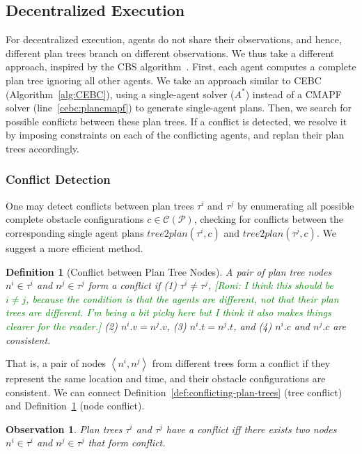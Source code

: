 \documentclass[letterpaper]{article} %
\newcommand{\toplan}{\textit{tree2plan}}
\newcommand{\tuple}[1]{\ensuremath{\left \langle #1 \right \rangle }}
\newcommand{\roni}[1]{{\textcolor{green}{[Roni: #1]}}}
\newtheorem{observation}{Observation}
\newtheorem{definition}{Definition}
\begin{document}
\subsection{Decentralized Execution}
\label{scn:decentralized}

For decentralized execution, agents do not share their observations, and hence, different plan trees branch on different observations. 
We thus take a different approach, inspired by the CBS algorithm~\cite{sharon2015conflict}. 
First, each agent computes a complete plan tree ignoring all other agents. We take an approach similar to CEBC (Algorithm~\ref{alg:CEBC}), using a single-agent solver ($A^*$) instead of a CMAPF solver (line~\ref{cebc:plancmapf}) to generate single-agent plans.
Then, we search for possible conflicts between these plan trees. 
If a conflict is detected, we resolve it by imposing 
constraints on each of the conflicting agents, and replan their plan trees accordingly. 


\subsubsection{Conflict Detection}
\label{scn:conflicts}
One may detect conflicts between plan trees $\tau^i$ and $\tau^j$ by enumerating all possible complete obstacle configurations $c\in\mathcal{C}(\mathcal{P})$, checking for conflicts between the corresponding single agent plans $\toplan(\tau^i,c)$ and $\toplan(\tau^j,c)$. 
We suggest a more efficient method. 
\begin{definition}[Conflict between Plan Tree Nodes]
A pair of plan tree nodes $n^i\in\tau^i$ and $n^j\in\tau^j$ 
form a conflict if 
(1) $\tau^i\neq\tau^j$, \roni{I think this should be $i\neq j$, because the condition is that the agents are different, not that their plan trees are different. I'm being a bit picky here but I think it also makes things clearer for the reader.}
(2) $n^i.v = n^j.v$, 
(3) $n^i.t = n^j.t$, 
and (4) $n^i.c$ and $n^j.c$ are consistent.
\label{def:mapfou-conflict}
\end{definition}
That is, a pair of nodes $\tuple{n^i,n^j}$ from different trees form a conflict if they represent the same location and time, and their obstacle configurations are consistent.  
We can connect Definition~\ref{def:conflicting-plan-trees} (tree conflict) and  Definition~\ref{def:mapfou-conflict} (node conflict).  
\begin{observation}
Plan trees $\tau^i$ and $\tau^j$ have a conflict 
iff there exists two nodes $n^i\in\tau^i$ and $n^j\in\tau^j$ that form conflict. 
\label{obs:conditionsForConflicts}
\end{observation} 
\end{document}
